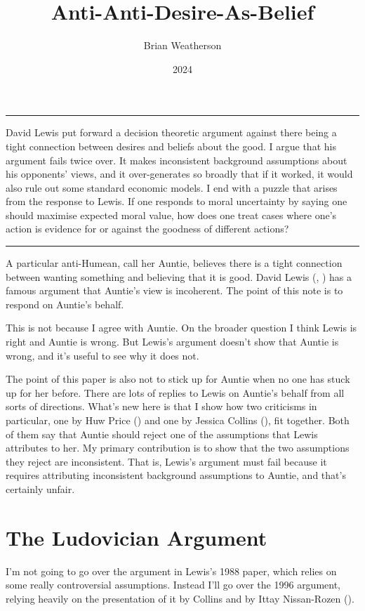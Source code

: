 \documentclass[
  10pt,
  letterpaper,
  DIV=11,
  numbers=noendperiod,
  twoside]{scrartcl}
\title{Anti-Anti-Desire-As-Belief}
\author{Brian Weatherson}
\date{2024}
\renewenvironment{abstract}
 {\vspace{-1.25cm}
 \quotation\small\noindent\rule{\linewidth}{.5pt}\par\smallskip
 \noindent }
 {\par\noindent\rule{\linewidth}{.5pt}\endquotation}
\begin{document}
\maketitle
\begin{abstract}
David Lewis put forward a decision theoretic argument against there
being a tight connection between desires and beliefs about the good. I
argue that his argument fails twice over. It makes inconsistent
background assumptions about his opponents' views, and it over-generates
so broadly that if it worked, it would also rule out some standard
economic models. I end with a puzzle that arises from the response to
Lewis. If one responds to moral uncertainty by saying one should
maximise expected moral value, how does one treat cases where one's
action is evidence for or against the goodness of different actions?
\end{abstract}


A particular anti-Humean, call her Auntie, believes there is a tight
connection between wanting something and believing that it is good.
David Lewis (,
) has a famous argument that Auntie's view
is incoherent. The point of this note is to respond on Auntie's behalf.

This is not because I agree with Auntie. On the broader question I think
Lewis is right and Auntie is wrong. But Lewis's argument doesn't show
that Auntie is wrong, and it's useful to see why it does not.

The point of this paper is also not to stick up for Auntie when no one
has stuck up for her before. There are lots of replies to Lewis on
Auntie's behalf from all sorts of directions. What's new here is that I
show how two criticisms in particular, one by Huw Price
() and one by Jessica Collins
(), fit together. Both of them say that
Auntie should reject one of the assumptions that Lewis attributes to
her. My primary contribution is to show that the two assumptions they
reject are inconsistent. That is, Lewis's argument must fail because it
requires attributing inconsistent background assumptions to Auntie, and
that's certainly unfair.

\section{The Ludovician Argument}\label{the-ludovician-argument}

I'm not going to go over the argument in Lewis's 1988 paper, which
relies on some really controversial assumptions. Instead I'll go over
the 1996 argument, relying heavily on the presentation of it by Collins
and by Ittay Nissan-Rozen ().
\end{document}
